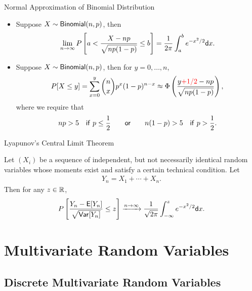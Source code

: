 \begin{frame}{Normal Approximation of Binomial Distribution}

\begin{itemize}
	\justifying
	\item {} Suppose $X\sim \mathsf{Binomial}(n, p)$, then
	\begin{align*}
	\lim_{n\rightarrow \infty} P\left[a < \frac{X-np}{\sqrt{np(1-p)}} \leq b \right] = \frac{1}{2\pi} \int_a^b e^{-x^2/2} \mathsf{d}x.
	\end{align*}
	\item Suppose $X\sim \mathsf{Binomial}(n, p)$, then for $y = 0, \ldots, n$,
	\begin{align*}
	P[X\leq y] = \sum_{x=0}^y \binom{n}{x} p^x(1-p)^{n-x} \approx \Phi\left(\frac{y\red{+1/2}-np}{\sqrt{np(1-p)}} \right),
	\end{align*}
	where we require that
	\begin{align*}
	np > 5 \quad \mathsf{if\ } p\leq \frac{1}{2} \qquad \mathsf{or}\qquad n(1-p) > 5 \quad \mathsf{if\ } p > \frac{1}{2}.
	\end{align*}
\end{itemize}

\end{frame}


\begin{frame}{Lyapunov's Central Limit Theorem}

\justifying
{} Let $(X_i)$ be a sequence of independent, but not necessarily identical random variables whose moments exist and satisfy a certain technical condition. Let
\begin{align*}
Y_n = X_1 + \cdots + X_n.
\end{align*}
Then for any $z\in \mathbb{R}$,
\begin{align*}
P\left[\frac{Y_n - \mathsf{E}[Y_n]}{\sqrt{\mathsf{Var}[Y_n]}} \leq z \right] \xrightarrow[]{n\rightarrow \infty} \frac{1}{\sqrt{2\pi}} \int_{-\infty}^{z} e^{-x^2/2} \mathsf{d}x.
\end{align*}

\end{frame}


\section{Multivariate Random Variables}

\subsection{Discrete Multivariate Random Variables}

